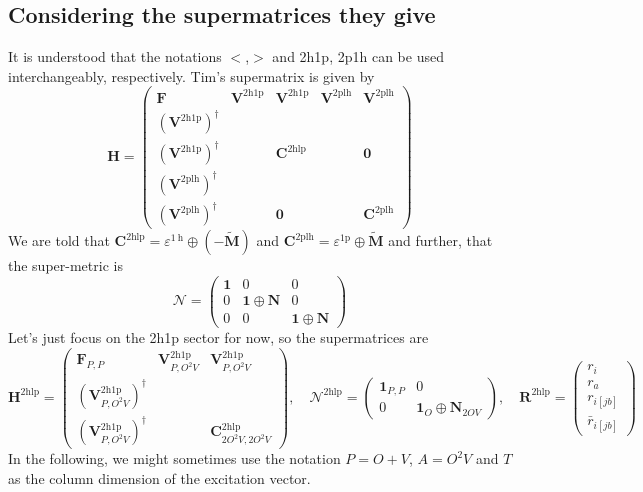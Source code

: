 \subsection{Considering the supermatrices they give}
It is understood that the notations $<$,$>$ and 2h1p, 2p1h can be used interchangeably, respectively. Tim's supermatrix is given by
\begin{equation}
\bm{H} =
\begin{pmatrix}
\bm{F} & \bm{V}^{2\mathrm{h1p}} & \bm{V}^{2\mathrm{h1p}} & \bm{V}^{2\mathrm{plh}} & \bm{V}^{2\mathrm{plh}} \\
\left(\bm{V}^{2\mathrm{h1p}}\right)^{\dagger} &  &  & & \\
\left(\bm{V}^{2\mathrm{h1p}}\right)^{\dagger} &  & \bm{C}^{2\mathrm{hlp}} & & \bm{0} \\
\left(\bm{V}^{2\mathrm{plh}}\right)^{\dagger} & & & & \\
\left(\bm{V}^{2\mathrm{plh}}\right)^{\dagger} &  & \bm{0} & & \bm{C}^{2\mathrm{plh}}
\end{pmatrix}
\end{equation}
We are told that $\mathbf{C}^{2 \mathrm{hlp}}=\varepsilon^{1 \mathrm{~h}} \oplus(-\tilde{\mathbf{M}})$ and $\mathbf{C}^{2 \mathrm{plh}}=\varepsilon^{1 \mathrm{p}} \oplus \tilde{\mathbf{M}}$ and further, that the super-metric is
\begin{equation}
    \bm{\mathcal{N}} = \begin{pmatrix}
\bm{1} & 0 & 0 \\
0 & \bm{1} \oplus \bm{N} & 0 \\
0 & 0 & \bm{1} \oplus \bm{N}
    \end{pmatrix}
\end{equation}
Let's just focus on the 2h1p sector for now, so the supermatrices are
\begin{equation}
    \bm{H}^{2 \mathrm{hlp}} = 
    \begin{pmatrix}
        \bm{F}_{P,P} & \bm{V}^{2\mathrm{h1p}}_{P,O^2V} & \bm{V}^{2\mathrm{h1p}}_{P,O^2V} \\
        \left(\bm{V}^{2\mathrm{h1p}}_{P,O^2V}\right)^{\dagger} &  &  \\
        \left(\bm{V}^{2\mathrm{h1p}}_{P,O^2V}\right)^{\dagger} &  & \bm{C}^{2\mathrm{hlp}}_{2O^2V,2O^2V}
    \end{pmatrix}, \quad
    \bm{\mathcal{N}}^{2 \mathrm{hlp}} =
    \begin{pmatrix}
        \bm{1}_{P,P} & 0 \\
        0 & \bm{1}_O \oplus \bm{N}_{2OV}
    \end{pmatrix}, \quad
\bm{R}^{2 \mathrm{hlp}} =
    \begin{pmatrix}
        r_i \\
        r_a \\
        r_{i[jb]} \\
        \bar{r}_{i[jb]}
    \end{pmatrix}
\end{equation}
In the following, we might sometimes use the notation $P=O+V$, $A=O^2V$ and $T$ as the column dimension of the excitation vector.

